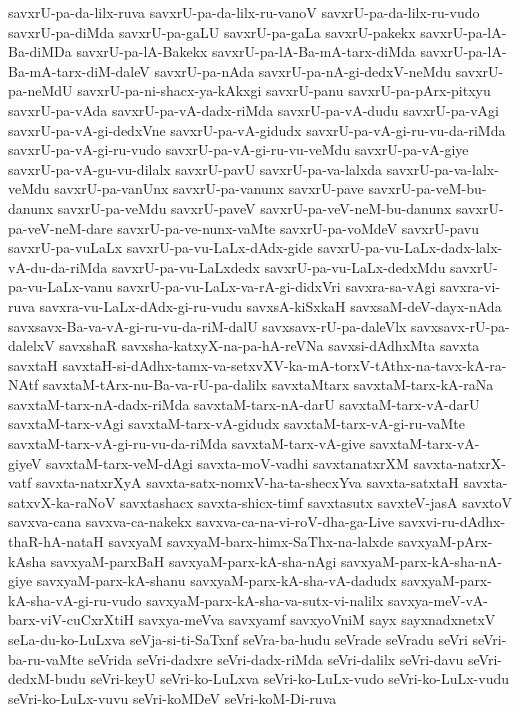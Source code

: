 {savxrU-pa-da-lilx-ruva
savxrU-pa-da-lilx-ru-vanoV
savxrU-pa-da-lilx-ru-vudo
savxrU-pa-diMda
savxrU-pa-gaLU
savxrU-pa-gaLa
savxrU-pakekx
savxrU-pa-lA-Ba-diMDa
savxrU-pa-lA-Bakekx
savxrU-pa-lA-Ba-mA-tarx-diMda
savxrU-pa-lA-Ba-mA-tarx-diM-daleV
savxrU-pa-nAda
savxrU-pa-nA-gi-dedxV-neMdu
savxrU-pa-neMdU
savxrU-pa-ni-shacx-ya-kAkxgi
savxrU-panu
savxrU-pa-pArx-pitxyu
savxrU-pa-vAda
savxrU-pa-vA-dadx-riMda
savxrU-pa-vA-dudu
savxrU-pa-vAgi
savxrU-pa-vA-gi-dedxVne
savxrU-pa-vA-gidudx
savxrU-pa-vA-gi-ru-vu-da-riMda
savxrU-pa-vA-gi-ru-vudo
savxrU-pa-vA-gi-ru-vu-veMdu
savxrU-pa-vA-giye
savxrU-pa-vA-gu-vu-dilalx
savxrU-pavU
savxrU-pa-va-lalxda
savxrU-pa-va-lalx-veMdu
savxrU-pa-vanUnx
savxrU-pa-vanunx
savxrU-pave
savxrU-pa-veM-bu-danunx
savxrU-pa-veMdu
savxrU-paveV
savxrU-pa-veV-neM-bu-danunx
savxrU-pa-veV-neM-dare
savxrU-pa-ve-nunx-vaMte
savxrU-pa-voMdeV
savxrU-pavu
savxrU-pa-vuLaLx
savxrU-pa-vu-LaLx-dAdx-gide
savxrU-pa-vu-LaLx-dadx-lalx-vA-du-da-riMda
savxrU-pa-vu-LaLxdedx
savxrU-pa-vu-LaLx-dedxMdu
savxrU-pa-vu-LaLx-vanu
savxrU-pa-vu-LaLx-va-rA-gi-didxVri
savxra-sa-vAgi
savxra-vi-ruva
savxra-vu-LaLx-dAdx-gi-ru-vudu
savxsA-kiSxkaH
savxsaM-deV-dayx-nAda
savxsavx-Ba-va-vA-gi-ru-vu-da-riM-dalU
savxsavx-rU-pa-daleVlx
savxsavx-rU-pa-dalelxV
savxshaR
savxsha-katxyX-na-pa-hA-reVNa
savxsi-dAdhxMta
savxta
savxtaH
savxtaH-si-dAdhx-tamx-va-setxvXV-ka-mA-torxV-tAthx-na-tavx-kA-ra-NAtf
savxtaM-tArx-nu-Ba-va-rU-pa-dalilx
savxtaMtarx
savxtaM-tarx-kA-raNa
savxtaM-tarx-nA-dadx-riMda
savxtaM-tarx-nA-darU
savxtaM-tarx-vA-darU
savxtaM-tarx-vAgi
savxtaM-tarx-vA-gidudx
savxtaM-tarx-vA-gi-ru-vaMte
savxtaM-tarx-vA-gi-ru-vu-da-riMda
savxtaM-tarx-vA-give
savxtaM-tarx-vA-giyeV
savxtaM-tarx-veM-dAgi
savxta-moV-vadhi
savxtanatxrXM
savxta-natxrX-vatf
savxta-natxrXyA
savxta-satx-nomxV-ha-ta-shecxYva
savxta-satxtaH
savxta-satxvX-ka-raNoV
savxtashacx
savxta-shicx-timf
savxtasutx
savxteV-jasA
savxtoV
savxva-cana
savxva-ca-nakekx
savxva-ca-na-vi-roV-dha-ga-Live
savxvi-ru-dAdhx-thaR-hA-nataH
savxyaM
savxyaM-barx-himx-SaThx-na-lalxde
savxyaM-pArx-kAsha
savxyaM-parxBaH
savxyaM-parx-kA-sha-nAgi
savxyaM-parx-kA-sha-nA-giye
savxyaM-parx-kA-shanu
savxyaM-parx-kA-sha-vA-dadudx
savxyaM-parx-kA-sha-vA-gi-ru-vudo
savxyaM-parx-kA-sha-va-sutx-vi-nalilx
savxya-meV-vA-barx-viV-cuCxrXtiH
savxya-meVva
savxyamf
savxyoVniM
sayx
sayxnadxnetxV
seLa-du-ko-LuLxva
seVja-si-ti-SaTxnf
seVra-ba-hudu
seVrade
seVradu
seVri
seVri-ba-ru-vaMte
seVrida
seVri-dadxre
seVri-dadx-riMda
seVri-dalilx
seVri-davu
seVri-dedxM-budu
seVri-keyU
seVri-ko-LuLxva
seVri-ko-LuLx-vudo
seVri-ko-LuLx-vudu
seVri-ko-LuLx-vuvu
seVri-koMDeV
seVri-koM-Di-ruva
}
